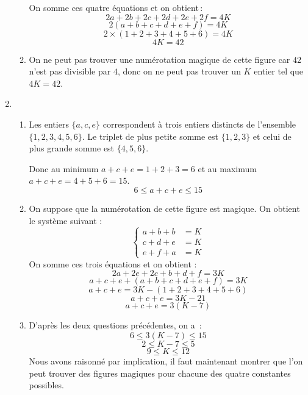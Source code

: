 \documentclass[10pt,a4paper]{article}
\begin{document}
\begin{enumerate}
\begin{enumerate}
On somme ces quatre équations et on obtient\,:
$$2a+2b+2c+2d+2e+2f=4K$$
$$2(a+b+c+d+e+f)=4K$$
$$2\times(1+2+3+4+5+6)=4K$$
$$\boxed{4K=42}$$
\item On ne peut pas trouver une numérotation magique de cette figure car $42$ n'est pas divisible par $4$, donc on ne peut pas trouver un $K$ entier tel que
$4K=42$.
\end{enumerate}
\item 
\begin{enumerate}
\item Les entiers $\{a,c,e\}$ correspondent à trois entiers distincts de l'ensemble $\{1,2,3,4,5,6\}$. Le triplet de plus petite somme est $\{1,2,3\}$ et 
celui de plus grande somme est $\{4,5,6\}$.

Donc au minimum $a+c+e=1+2+3=6$ et au maximum $a+c+e=4+5+6=15$.
$$\boxed{6\leqslant a+c+e \leqslant 15}$$
\item On suppose que la numérotation de cette figure est magique. On obtient le système suivant :
$$\begin{cases}
a+b+b&=K\\
c+d+e&=K\\
e+f+a&=K
\end{cases}$$
On somme ces trois équations et on obtient :
$$2a+2e+2c+b+d+f=3K$$
$$a+c+e+(a+b+c+d+e+f)=3K$$
$$a+c+e=3K-(1+2+3+4+5+6)$$
$$a+c+e=3K-21$$
$$\boxed{a+c+e=3(K-7)}$$
\item D'après les deux questions précédentes, on a\, :
$$6\leqslant 3(K-7)\leqslant 15$$
$$2\leqslant K-7\leqslant 5$$
$$9\leqslant K\leqslant 12$$
Nous avons raisonné par implication, il faut maintenant montrer que l'on peut trouver des figures magiques pour chacune des quatre constantes possibles.



\end{enumerate}
\end{enumerate}
\end{document}
